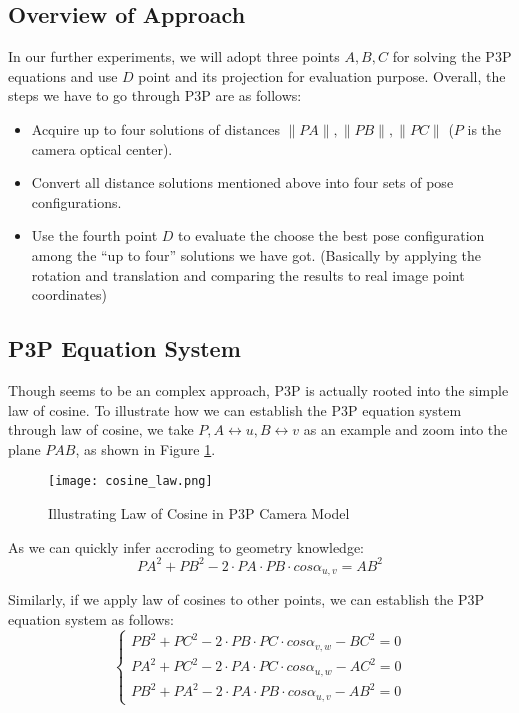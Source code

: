 \documentclass[conference]{IEEEtran}
\begin{document}
\subsection{Overview of Approach}
In our further experiments, we will adopt three points $A, B, C$ for solving the P3P equations and use $D$ point and its projection for evaluation purpose. Overall, the steps we have to go through P3P are as follows:
\begin{itemize}
\item Acquire up to four solutions of distances $\|PA\|, \|PB\|, \|PC\|$ ($P$ is the camera optical center).
\item Convert all distance solutions mentioned above into four sets of pose configurations.
\item Use the fourth point $D$ to evaluate the choose the best pose configuration among the ``up to four'' solutions we have got. (Basically by applying the rotation and translation and comparing the results to real image point coordinates)
\end{itemize}

\subsection{P3P Equation System}
Though seems to be an complex approach, P3P is actually rooted into the simple law of cosine. To illustrate how we can establish the P3P equation system through law of cosine, we take $P, A\leftrightarrow u, B\leftrightarrow v$ as an example and zoom into the plane $PAB$, as shown in Figure \ref{cosine_law}. 
\begin{figure}
  \centering \texttt{[image: cosine\_law.png]}
  \caption{Illustrating Law of Cosine in P3P Camera Model}
  \label{cosine_law}
\end{figure}

As we can quickly infer accroding to geometry knowledge:
\begin{equation}
	PA^2 + PB^2 - 2\cdot PA\cdot PB\cdot cos\alpha _{u, v} = AB^2
\end{equation}

Similarly, if we apply law of cosines to other points, we can establish the P3P equation system as follows:
\begin{equation}
	\begin{cases} PB^2 + PC^2 - 2\cdot PB\cdot PC\cdot cos\alpha _{v, w} - BC^2 = 0 \\
	 PA^2 + PC^2 - 2\cdot PA\cdot PC\cdot cos\alpha _{u, w} - AC^2 = 0 \\
	 PB^2 + PA^2 - 2\cdot PA\cdot PB\cdot cos\alpha _{u, v} - AB^2 = 0 \end{cases}
\end{equation}
\end{document}
